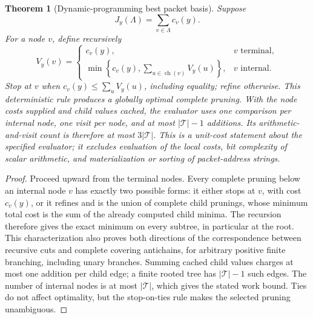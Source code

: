 \documentclass[11pt,letterpaper]{article}
\newtheorem{theorem}{Theorem}[section]
\theoremstyle{plain}
\theoremstyle{plain}
\theoremstyle{plain}
\theoremstyle{definition}
\theoremstyle{definition}
\theoremstyle{definition}
\theoremstyle{definition}
\theoremstyle{remark}
\theoremstyle{remark}
\theoremstyle{remark}
\theoremstyle{remark}
\begin{document}
\begin{theorem}[Dynamic-programming best packet basis]\label{result:15}
Suppose
\[
J_y(\Lambda)=\sum_{v\in\Lambda}c_v(y).
\]
For a node $v$, define recursively
\[
V_y(v)
=
\begin{cases}
c_v(y),&v\text{ terminal},\\[2mm]
\displaystyle
\min\left\{c_v(y),\sum_{u\in\operatorname{ch}(v)}V_y(u)\right\},
&v\text{ internal}.
\end{cases}
\]
Stop at $v$ when $c_v(y)\le\sum_uV_y(u)$, including equality; refine otherwise. This deterministic rule produces a globally optimal complete pruning. With the node costs supplied and child values cached, the evaluator uses one comparison per internal node, one visit per node, and at most $|\mathcal T|-1$ additions. Its arithmetic-and-visit count is therefore at most $3|\mathcal T|$. This is a unit-cost statement about the specified evaluator; it excludes evaluation of the local costs, bit complexity of scalar arithmetic, and materialization or sorting of packet-address strings.
\end{theorem}

\begin{proof}
Proceed upward from the terminal nodes.  Every complete pruning below an internal node $v$ has exactly two possible forms: it either stops at $v$, with cost $c_v(y)$, or it refines and is the union of complete child prunings, whose minimum total cost is the sum of the already computed child minima.  The recursion therefore gives the exact minimum on every subtree, in particular at the root. This characterization also proves both directions of the correspondence between recursive cuts and complete covering antichains, for arbitrary positive finite branching, including unary branches. Summing cached child values charges at most one addition per child edge; a finite rooted tree has $|\mathcal T|-1$ such edges. The number of internal nodes is at most $|\mathcal T|$, which gives the stated work bound. Ties do not affect optimality, but the stop-on-ties rule makes the selected pruning unambiguous.
\end{proof}
\end{document}
